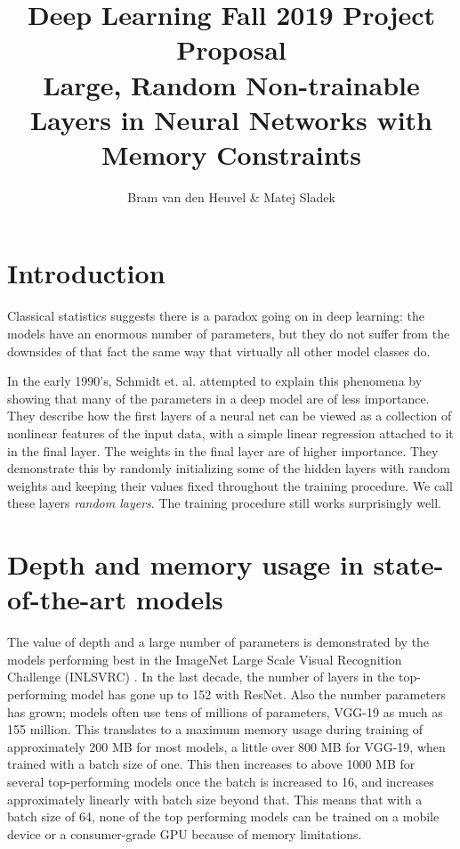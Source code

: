 \documentclass[]{article}
\title{\vspace{-2cm}Deep Learning Fall 2019 Project Proposal\\\large{Large, Random Non-trainable Layers in Neural Networks with Memory Constraints}}
\author{Bram van den Heuvel \& Matej Sladek}
\begin{document}
\maketitle

\begin{multicols}{2}
	\section{Introduction}
	Classical statistics suggests there is a paradox going on in deep learning: the models have an enormous number of parameters, but they do not suffer from the downsides of that fact the same way that virtually all other model classes do.
	
	In the early 1990's, Schmidt et. al. \cite{Schmidt_Kraaijveld_Duin} attempted to explain this phenomena by showing that many of the parameters in a deep model are of less importance. They describe how the first layers of a neural net can be viewed as a collection of nonlinear features of the input data, with a simple linear regression attached to it in the final layer. The weights in the final layer are of higher importance. They demonstrate this by randomly initializing some of the hidden layers with random weights and keeping their values fixed throughout the training procedure. We call these layers \emph{random layers}. The training procedure still works surprisingly well.
	
	
	\section{Depth and memory usage in state-of-the-art models}
	The value of depth and a large number of parameters is demonstrated by the models performing best in the ImageNet Large Scale Visual Recognition Challenge (INLSVRC) \cite{DBLP:journals/corr/CanzianiPC16}. In the last decade, the number of layers in the top-performing model has gone up to 152 with ResNet. Also the number parameters has grown; models often use tens of millions of parameters, VGG-19 as much as 155 million. This translates to a maximum memory usage during training of approximately 200 MB for most models, a little over 800 MB for VGG-19, when trained with a batch size of one. This then increases to above 1000 MB for several top-performing models once the batch is increased to 16, and increases approximately linearly with batch size beyond that. This means that with a batch size of 64, none of the top performing models can be trained on a mobile device or a consumer-grade GPU because of memory limitations.
	

\end{multicols}
\end{document}
